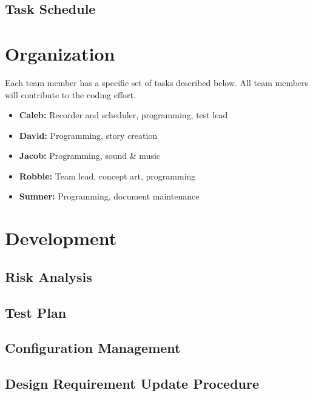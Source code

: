 \documentclass[12pt,titlepage]{article}
\begin{document}
\subsection{Task Schedule}

\section{Organization}
Each team member has a specific set of tasks described below. All team members
will contribute to the coding effort.
\begin{itemize}
    \item \textbf{Caleb:} Recorder and scheduler, programming, test lead
    \item \textbf{David:} Programming, story creation
    \item \textbf{Jacob:} Programming, sound \& music
    \item \textbf{Robbie:} Team lead, concept art, programming
    \item \textbf{Sumner:} Programming, document maintenance
\end{itemize}

\section{Development}

\subsection{Risk Analysis}

\subsection{Test Plan}

\subsection{Configuration Management}

\subsection{Design Requirement Update Procedure}
\end{document}
